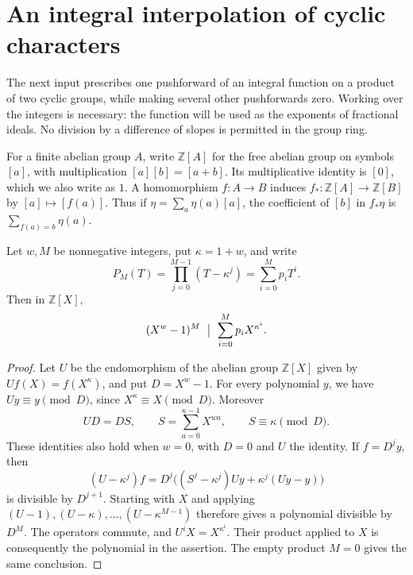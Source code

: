 \section{An integral interpolation of cyclic characters}
\label{se-section}

The next input prescribes one pushforward of an integral
function on a product of two cyclic groups, while making
several other pushforwards zero.  Working over the integers
is necessary: the function will be used as the exponents
of fractional ideals.  No division by a difference of
slopes is permitted in the group ring.

For a finite abelian group \(A\), write
\(\mathbb Z[A]\) for the free abelian group on symbols
\([a]\), with multiplication \([a][b]=[a+b]\).
Its multiplicative identity is \([0]\), which we also
write as \(1\).
A homomorphism \(f:A\to B\) induces
\(f_*:\mathbb Z[A]\to\mathbb Z[B]\) by
\([a]\mapsto[f(a)]\).
Thus if \(\eta=\sum_a\eta(a)[a]\), the coefficient
of \([b]\) in \(f_*\eta\) is
\(\sum_{f(a)=b}\eta(a)\).

\begin{lemma}\label{se-difference}
Let \(w,M\) be nonnegative integers, put \(\kappa=1+w\),
and write
\[
 P_M(T)=\prod_{j=0}^{M-1}(T-\kappa^j)
                    =\sum_{i=0}^M p_iT^i.
\]
Then in \(\mathbb Z[X]\),
\[
                (X^w-1)^M
                    \ \bigm|\ \sum_{i=0}^M p_iX^{\kappa^i}.
\]
\end{lemma}
\begin{proof}
Let \(U\) be the endomorphism of the abelian group
\(\mathbb Z[X]\) given by \(Uf(X)=f(X^\kappa)\),
and put \(D=X^w-1\).
For every polynomial \(y\), we have
\(Uy\equiv y\pmod D\), since \(X^\kappa\equiv X\pmod D\).
Moreover
\[
 UD=D S,\qquad
 S=\sum_{a=0}^{\kappa-1}X^{wa},\qquad
 S\equiv\kappa\pmod D.
\]
These identities also hold when \(w=0\), with
\(D=0\) and \(U\) the identity.
If \(f=D^jy\), then
\[
 (U-\kappa^j)f
   =D^j\bigl((S^j-\kappa^j)Uy
                      +\kappa^j(Uy-y)\bigr)
\]
is divisible by \(D^{j+1}\).
Starting with \(X\) and applying
\((U-1),(U-\kappa),\ldots,(U-\kappa^{M-1})\)
therefore gives a polynomial divisible by \(D^M\).
The operators commute, and \(U^iX=X^{\kappa^i}\).
Their product applied to \(X\) is consequently the
polynomial in the assertion.
The empty product \(M=0\) gives the same conclusion.
\end{proof}

